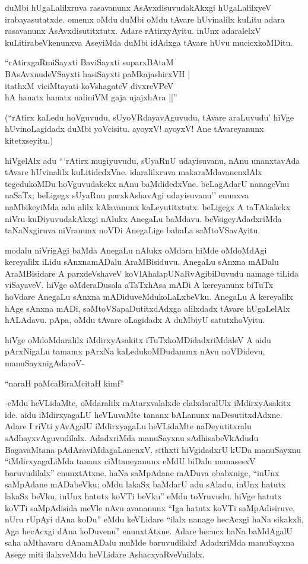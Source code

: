 duMbi hUgaLalilxruva rasavanunx AsAvxdisuvudakAkxgi hUgaLalilxyeV irabayasutatxde. omemx oMdu duMbi oMdu tAvare hUvinalilx kuLitu adara rasavanunx AsAvxdisutitxtutx. Adare rAtirxyAyitu. inUnx adaralelxV kuLitirabeVkenunxva AseyiMda duMbi idAdxga tAvare hUvu mucicxkoMDitu.

\begin{shloka}
``rAtirxgaRmiSayxti BaviSayxti suparxBAtaM\\
BAsAvxnudeVSayxti hasiSayxti paMkajashirxVH‌ |\\
itathxM viciMtayati koVshagateV divxreVPeV\\
hA hanatx hanatx naliniVM gaja ujajxhAra ||''
\end{shloka}

(``rAtirx kaLedu hoVguvudu, sUyoVRdayavAguvudu, tAvare araLuvudu' hiVge hUvinoLagidadx duMbi yoVcisitu. ayoyxV! ayoyxV! Ane tAvareyanunx kitetxseyitu.)

hiVgelAlx adu ```rAtirx mugiyuvudu, sUyaRnU udayisuvanu, nAnu unanxtavAda tAvare hUvinalilx kuLitidedxVne. idaralilxruva makaraMdavanenxlAlx tegedukoMDu hoVguvudakekx nAnu baMdidedxVne. beLagAdarU nanageVnu naSaTx; beLigegx sUyaRnu parxkAshavAgi udayisuvanu'' enunxva naMbikeyiMda adu alilx kAlavanunx kaLeyutitxtutx. beLigegx A taTAkakekx niVru kuDiyuvudakAkxgi nAlukx AnegaLu baMdavu. beVsigeyAdadxriMda taNaNxgiruva niVranunx noVDi AnegaLige bahaLa saMtoVSavAyitu.

modalu niVrigAgi baMda AnegaLu nAlukx oMdara hiMde oMdoMdAgi kereyalilx iLidu sAnxnamADalu AraMBisiduvu. AnegaLu sAnxna mADalu AraMBisidare A parxdeVshaveV koVlAhalapUNaRvAgibiDuvudu namage tiLida viSayaveV. hiVge oMderaDusala aTaTxhAsa mADi A kereyanunx biTuTx hoVdare AnegaLu sAnxna mADiduveMdukoLaLxbeVku. AnegaLu A kereyalilx hAge sAnxna mADi, saMtoVSapaDutitxdAdxga alilxdadx tAvare hUgaLelAlx hALAdavu. pApa, oMdu tAvare oLagidadx A duMbiyU satutxhoVyitu.

hiVge oMdoMdaralilx iMdirxyAsakitx iTuTxkoMDidadxriMdaleV A aidu pArxNigaLu tamamx pArxNa kaLedukoMDudanunx nAvu noVDidevu, manuSayxnigAdaroV-

\begin{shloka}
``naraH paMcaBiraMcitaH kimf''
\end{shloka}

-eMdu heVLidaMte, oMdaralilx mAtarxvalalxde elalxdaralUlx iMdirxyAsakitx ide. aidu iMdirxyagaLU heVLuvaMte tananx bALanunx naDesutitxdAdxne. Adare I riVti yAvAgalU iMdirxyagaLu heVLidaMte naDeyutitxralu sAdhayxvAguvudilalx. AdadxriMda manuSayxnu sAdhisabeVkAdudu BagavaMtana pAdAraviMdagaLanenxV. sithxti hiVgidadxrU kUDa manuSayxnu ``iMdirxyagaLiMda tananx ciMtaneyanunx eMdU biDalu manasesxV baruvudilalx'' enunxtAtxne. haNa saMpAdane mADuva obabxnige, ``inUnx saMpAdane mADabeVku; oMdu lakaSx baMdarU adu sAladu, inUnx hatutx lakaSx beVku, inUnx hatutx  koVTi beVku'' eMdu toVruvudu. hiVge hatutx koVTi saMpAdisida meVle nAvu avananunx ``Iga hatutx koVTi saMpAdisiruve, nUru rUpAyi dAna koDu'' eMdu keVLidare ``ilalx nanage hecAcxgi haNa sikakxli, Aga hecAcxgi dAna koDuvenu'' enunxtAtxne. Adare hecucx haNa baMdAgalU saha aMthavaru dAnamADalu muMde baruvudilalx! AdadxriMda manuSayxna Asege miti ilalxveMdu heVLidare AshacxyaRveVnilalx.

